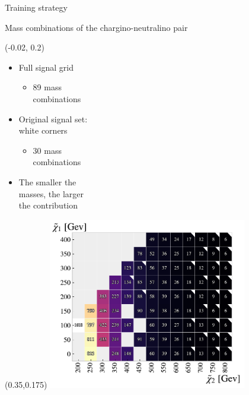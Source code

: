 \documentclass[UKenglish]{beamer}
\begin{document}
\begin{frame}{Training strategy}
 
\end{frame}

\begin{frame}{Mass combinations of the chargino-neutralino pair}
    \begin{textblock}{1}(-0.02, 0.2)
        \begin{itemize}
            \item Full signal grid
            \begin{itemize}
                \item 89 mass\\ combinations
            \end{itemize}
            \item Original signal set: \\white corners
            \begin{itemize}
                \item 30 mass \\combinations
            \end{itemize}
            \item The smaller the \\masses,
                  the larger\\ the contribution            
        \end{itemize}
    \end{textblock}
    \begin{textblock}{1.0}(0.35,0.175)
        \includegraphics[width=0.65\textwidth]{figures/Signal/NrSignalEvents.pdf}
    \end{textblock}
\end{frame}
\end{document}
